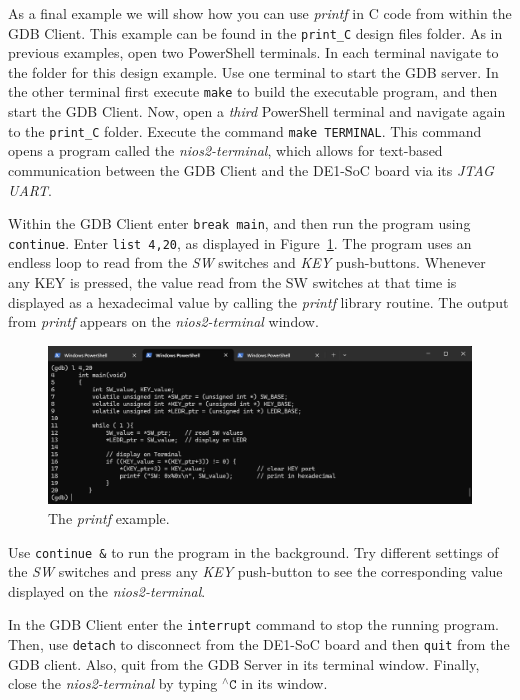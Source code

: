 \documentclass[11pt, twoside, pdftex]{article}
\begin{document}
As a final example we will show how you can use {\it printf} in C code from within the GDB 
Client.  This example can be found in the \texttt{print\_C} design files folder.
As in previous examples, open two PowerShell terminals. In each terminal 
navigate to the folder for this design example. Use one 
terminal to start the GDB server. In the other terminal first execute \texttt{make} to
build the executable program, and then start the GDB Client.
Now, open a {\it third} PowerShell terminal and navigate again to the \texttt{print\_C} folder.
Execute the command \texttt{make TERMINAL}. This command opens a program called the
{\it nios2-terminal}, which allows for text-based communication between the GDB Client and 
the DE1-SoC board via its {\it JTAG UART}.

Within the GDB Client enter \texttt{break main}, and then run the program using \texttt{continue}.
Enter \texttt{list 4,20}, as displayed in Figure~\ref{fig:print_C1}. The program uses an
endless loop to read from the {\it SW} switches and {\it KEY} push-buttons. Whenever any
KEY is pressed, the value read from the SW switches at that time is displayed as a
hexadecimal value by calling the {\it printf} library routine. The output from {\it printf}
appears on the {\it nios2-terminal} window. 

\begin{figure}[h]
    \begin{center}
        \includegraphics[scale=.6]{figures/print_C1.png}
        \caption{The {\it printf} example.}
        \label{fig:print_C1}
    \end{center}
\end{figure}

Use \texttt{continue \&} to run the program in the background. Try different settings of 
the {\it SW} switches and press any {\it KEY} push-button to see the corresponding value 
displayed on the {\it nios2-terminal}.

In the GDB Client enter the \texttt{interrupt} command to stop the running program.
Then, use \texttt{detach} to disconnect from the DE1-SoC board and then
\texttt{quit} from the GDB client. Also, quit from the GDB Server in its terminal window.
Finally, close the {\it nios2-terminal} by typing $^{\wedge}\texttt{C}$ in its window.
\end{document}
